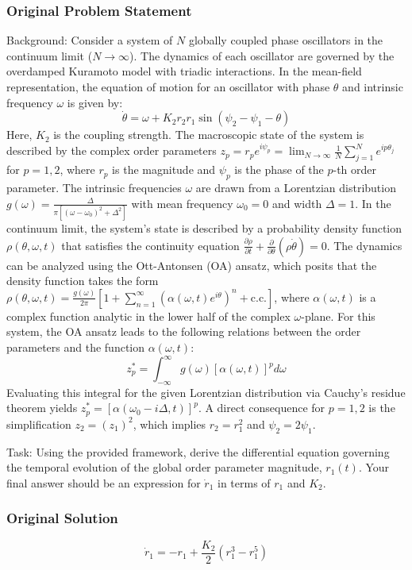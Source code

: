 \documentclass[10pt]{article}
\begin{document}
\subsubsection*{Original Problem Statement}
Background:
Consider a system of $N$ globally coupled phase oscillators in the continuum limit ($N \to \infty$). The dynamics of each oscillator are governed by the overdamped Kuramoto model with triadic interactions. In the mean-field representation, the equation of motion for an oscillator with phase $\theta$ and intrinsic frequency $\omega$ is given by:
$$ \dot{\theta} = \omega + K_2 r_2 r_1 \sin(\psi_2 - \psi_1 - \theta) $$
Here, $K_2$ is the coupling strength. The macroscopic state of the system is described by the complex order parameters $z_p = r_p e^{i\psi_p} = \lim_{N\to\infty} \frac{1}{N} \sum_{j=1}^N e^{ip\theta_j}$ for $p=1,2$, where $r_p$ is the magnitude and $\psi_p$ is the phase of the $p$-th order parameter. The intrinsic frequencies $\omega$ are drawn from a Lorentzian distribution $g(\omega) = \frac{\Delta}{\pi [(\omega - \omega_0)^2 + \Delta^2]}$ with mean frequency $\omega_0 = 0$ and width $\Delta=1$. In the continuum limit, the system's state is described by a probability density function $\rho(\theta, \omega, t)$ that satisfies the continuity equation $\frac{\partial \rho}{\partial t} + \frac{\partial}{\partial \theta}(\rho \dot{\theta}) = 0$. The dynamics can be analyzed using the Ott-Antonsen (OA) ansatz, which posits that the density function takes the form $\rho(\theta, \omega, t) = \frac{g(\omega)}{2\pi} \left[ 1 + \sum_{n=1}^{\infty} (\alpha(\omega, t) e^{i\theta})^n + \text{c.c.} \right]$, where $\alpha(\omega, t)$ is a complex function analytic in the lower half of the complex $\omega$-plane. For this system, the OA ansatz leads to the following relations between the order parameters and the function $\alpha(\omega, t)$:
$$ z_p^* = \int_{-\infty}^{\infty} g(\omega) [\alpha(\omega, t)]^p d\omega $$
Evaluating this integral for the given Lorentzian distribution via Cauchy's residue theorem yields $z_p^* = [\alpha(\omega_0 - i\Delta, t)]^p$. A direct consequence for $p=1,2$ is the simplification $z_2 = (z_1)^2$, which implies $r_2 = r_1^2$ and $\psi_2 = 2\psi_1$.

Task:
Using the provided framework, derive the differential equation governing the temporal evolution of the global order parameter magnitude, $r_1(t)$. Your final answer should be an expression for $\dot{r}_1$ in terms of $r_1$ and $K_2$.

\subsubsection*{Original Solution}
\[ \dot{r}_1 = -r_1 + \frac{K_2}{2} (r_1^3 - r_1^5) \]
\end{document}
